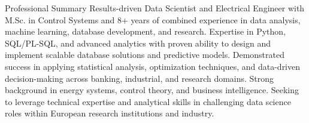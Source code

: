 \begin{rubric}{Professional Summary}
\entry*%
    Results-driven Data Scientist and Electrical Engineer with M.Sc. in Control Systems and 8+ years of combined experience in data analysis, machine learning, database development, and research. Expertise in Python, SQL/PL-SQL, and advanced analytics with proven ability to design and implement scalable database solutions and predictive models. Demonstrated success in applying statistical analysis, optimization techniques, and data-driven decision-making across banking, industrial, and research domains. Strong background in energy systems, control theory, and business intelligence. Seeking to leverage technical expertise and analytical skills in challenging data science roles within European research institutions and industry.
\end{rubric}
